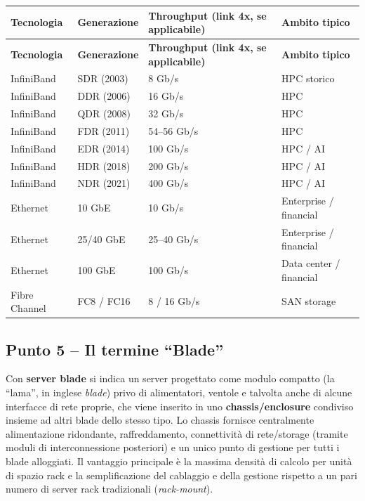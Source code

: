 \documentclass[11pt,a4paper]{article}
\begin{document}
\begin{center}
\begin{longtable}{p{3.6cm}p{3.0cm}p{3.0cm}p{3.8cm}}
\toprule
\textbf{Tecnologia} & \textbf{Generazione} & \textbf{Throughput (link 4x, se applicabile)} & \textbf{Ambito tipico} \\
\midrule
\endfirsthead
\toprule
\textbf{Tecnologia} & \textbf{Generazione} & \textbf{Throughput (link 4x, se applicabile)} & \textbf{Ambito tipico} \\
\midrule
\endhead
InfiniBand & SDR (2003) & 8 Gb/s & HPC storico \\
InfiniBand & DDR (2006) & 16 Gb/s & HPC \\
InfiniBand & QDR (2008) & 32 Gb/s & HPC \\
InfiniBand & FDR (2011) & 54--56 Gb/s & HPC \\
InfiniBand & EDR (2014) & 100 Gb/s & HPC / AI \\
InfiniBand & HDR (2018) & 200 Gb/s & HPC / AI \\
InfiniBand & NDR (2021) & 400 Gb/s & HPC / AI \\
Ethernet & 10 GbE & 10 Gb/s & Enterprise / financial \\
Ethernet & 25/40 GbE & 25--40 Gb/s & Enterprise / financial \\
Ethernet & 100 GbE & 100 Gb/s & Data center / financial \\
Fibre Channel & FC8 / FC16 & 8 / 16 Gb/s & SAN storage \\
\bottomrule
\end{longtable}
\end{center}

\subsection{Punto 5 -- Il termine ``Blade''}

Con \textbf{server blade} si indica un server progettato come modulo compatto (la ``lama'', in inglese \emph{blade}) privo di alimentatori, ventole e talvolta anche di alcune interfacce di rete proprie, che viene inserito in uno \textbf{chassis/enclosure} condiviso insieme ad altri blade dello stesso tipo. Lo chassis fornisce centralmente alimentazione ridondante, raffreddamento, connettività di rete/storage (tramite moduli di interconnessione posteriori) e un unico punto di gestione per tutti i blade alloggiati. Il vantaggio principale è la massima densità di calcolo per unità di spazio rack e la semplificazione del cablaggio e della gestione rispetto a un pari numero di server rack tradizionali (\emph{rack-mount}).
\end{document}
